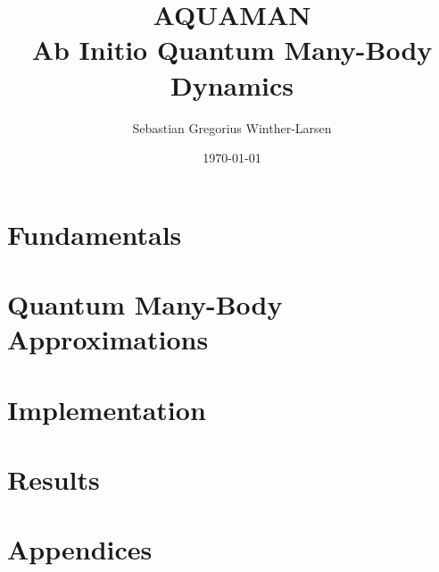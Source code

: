 \documentclass[twoside, english, notitlepage, 10pt]{uiofysmaster}
\author{Sebastian Gregorius Winther-Larsen}
\title{\textbf{AQUAMAN} \\ \textbf{A}b Initio \textbf{Qua}ntum \textbf{Man}y-Body Dynamics}
\date{\today}
\begin{document}
\frontmatter
    \maketitle

    \tableofcontents

\mainmatter

    \part{Fundamentals}

        
        

    \part{Quantum Many-Body Approximations}

        
        
        

    \part{Implementation}

        
         
    
    \part{Results}
        
        
        

    \part{Appendices}
    \appendix

        
        
        
        
        

    \printbibliography
\end{document}
